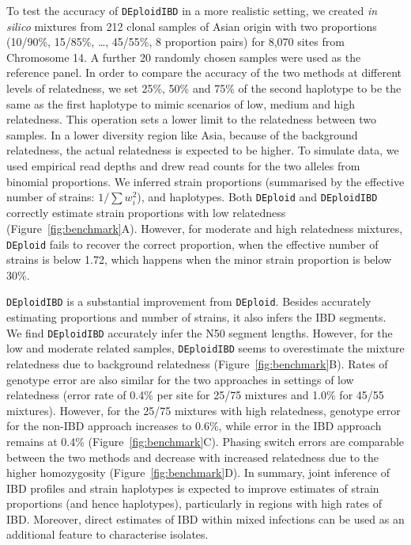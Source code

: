 \documentclass[9pt,lineno]{elife}
\begin{document}
To test the accuracy of \texttt{DEploidIBD} in a more realistic setting, we created {\it in silico} mixtures from 212 clonal samples of Asian origin with two proportions (10/90\%, 15/85\%, \dots, 45/55\%, 8 proportion pairs) for 8,070 sites from Chromosome 14.  A further 20 randomly chosen samples were used as the reference panel. In order to compare the accuracy of the two methods at different levels of relatedness, we set 25\%, 50\% and 75\% of the second haplotype to be the same as the first haplotype to mimic scenarios of low, medium and high relatedness. This operation sets a lower limit to the relatedness between two samples. In a lower diversity region like Asia, because of the background relatedness, the actual relatedness is expected to be higher.  To simulate data, we used empirical read depths and drew read counts for the two alleles from binomial proportions.  We inferred strain proportions (summarised by the effective number of strains: $1/\sum w_{i}^{2}$), and haplotypes. Both \texttt{DEploid} and \texttt{DEploidIBD} correctly estimate strain proportions with low relatedness (Figure~\ref{fig:benchmark}A). However, for moderate and high relatedness mixtures, \texttt{DEploid} fails to recover the correct proportion, when the effective number of strains is below 1.72, which happens when the minor strain proportion is below 30\%.

\texttt{DEploidIBD} is a substantial improvement from \texttt{DEploid}. Besides accurately estimating proportions and number of strains, it also infers the IBD segments. We find \texttt{DEploidIBD} accurately infer the N50 segment lengths. However, for the low and moderate related samples, \texttt{DEploidIBD} seems to overestimate the mixture relatedness due to background relatedness (Figure~\ref{fig:benchmark}B). Rates of genotype error are also similar for the two approaches in settings of low relatedness (error rate of 0.4\% per site for 25/75 mixtures and 1.0\% for 45/55 mixtures).  However, for the 25/75 mixtures with high relatedness, genotype error for the non-IBD approach increases to 0.6\%, while error in the IBD approach remains at 0.4\% (Figure~\ref{fig:benchmark}C). Phasing switch errors are comparable between the two methods and decrease with increased relatedness due to the higher homozygosity (Figure~\ref{fig:benchmark}D). In summary, joint inference of IBD profiles and strain haplotypes is expected to improve estimates of strain proportions (and hence haplotypes), particularly in regions with high rates of IBD. Moreover, direct estimates of IBD within mixed infections can be used as an additional feature to characterise isolates.
\end{document}
